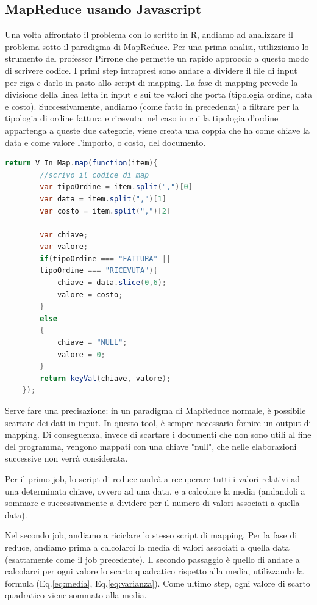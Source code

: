 \subsection{MapReduce usando Javascript}
Una volta affrontato il problema con lo scritto in R, andiamo ad analizzare il problema sotto il paradigma di MapReduce. Per una prima analisi, utilizziamo lo strumento del professor Pirrone che permette un rapido approccio a questo modo di scrivere codice. I primi step intrapresi sono andare a dividere il file di input per riga e darlo in pasto allo script di mapping.
La fase di mapping prevede la divisione della linea letta in input e sui tre valori che porta (tipologia ordine, data e costo). Successivamente, andiamo (come fatto in precedenza) a filtrare per la tipologia di ordine fattura e ricevuta: nel caso in cui la tipologia d'ordine appartenga a queste due categorie, viene creata una coppia che ha come chiave la data e come valore l'importo, o costo, del documento.


\begin{lstlisting}[language=Java, caption={Script di mapping}]
    return V_In_Map.map(function(item){
        //scrivo il codice di map
        var tipoOrdine = item.split(",")[0]
        var data = item.split(",")[1]
        var costo = item.split(",")[2]

        var chiave;
        var valore;
        if(tipoOrdine === "FATTURA" ||
        tipoOrdine === "RICEVUTA"){
            chiave = data.slice(0,6);
            valore = costo;
        }
        else
        {
            chiave = "NULL";
            valore = 0;
        }
        return keyVal(chiave, valore);
    });

\end{lstlisting}
Serve fare una precisazione: in un paradigma di MapReduce normale, è possibile scartare dei dati in input. In questo tool, è sempre necessario fornire un output di mapping. Di conseguenza, invece di scartare i documenti che non sono utili al fine del programma, vengono mappati con una chiave "null", che nelle elaborazioni successive non verrà considerata.

Per il primo job, lo script di reduce andrà a recuperare tutti i valori relativi ad una determinata chiave, ovvero ad una data, e a calcolare la media (andandoli a sommare e successivamente a dividere per il numero di valori associati a quella data).

Nel secondo job, andiamo a riciclare lo stesso script di mapping. Per la fase di reduce, andiamo prima a calcolarci la media di valori associati a quella data (esattamente come il job precedente). Il secondo passaggio è quello di andare a calcolarci per ogni valore lo scarto quadratico rispetto alla media, utilizzando la formula (Eq.\ref{eq:media}, Eq.\ref{eq:varianza}). Come ultimo step, ogni valore di scarto quadratico viene sommato alla media.

